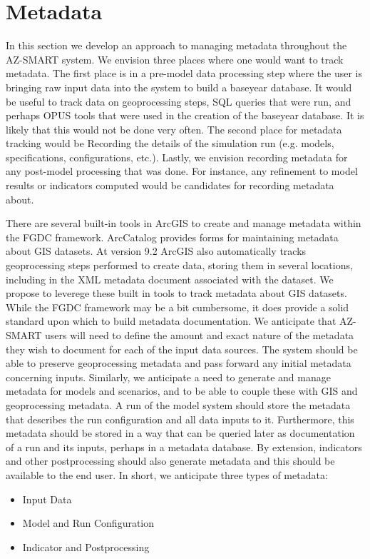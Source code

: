 \section{Metadata}

In this section we develop an approach to managing metadata throughout the AZ-SMART system.  
We envision three places where one would want to track metadata.  The first place is in a pre-model 
data processing step where the user is bringing raw input data into the system to build a baseyear 
database.  It would be useful to track data on geoprocessing steps, SQL queries that were run, and
perhaps OPUS tools that were used in the creation of the baseyear database.  It is likely that this
would not be done very often.  The second place for metadata tracking would be Recording the details
of the simulation run (e.g. models, specifications, configurations, etc.).  Lastly, we envision
recording metadata for any post-model processing that was done.  For instance, any refinement to
model results or indicators computed would be candidates for recording metadata about.

There are several built-in tools in ArcGIS to create and manage metadata within the FGDC framework.  ArcCatalog 
provides forms for maintaining metadata about GIS datasets.  At version 9.2 ArcGIS also automatically
tracks geoprocessing steps performed to create data, storing them in several locations, including 
in the XML metadata document associated with the dataset.
We propose to leverege these built in tools to track metadata about GIS datasets.  While the FGDC framework
may be a bit cumbersome, it does provide a solid standard upon which to build metadata documentation.
We anticipate that AZ-SMART
users will need to define the amount and exact nature of the metadata they wish to document for each of
the input data sources.  The system should be able to preserve geoprocessing metadata and pass forward
any initial metadata concerning inputs.  Similarly, we anticipate a need to generate and manage
metadata for models and scenarios, and to be able to couple these with GIS and geoprocessing
metadata.  A run of the model system should store the metadata that describes the run configuration
and all data inputs to it.  Furthermore, this metadata should be stored in a way that can be queried
later as documentation of a run and its inputs, perhaps in a metadata database.  By extension, indicators
and other postprocessing should also generate metadata and this should be available to the end user.  
In short, we anticipate three types of metadata:

\begin{itemize}
\item Input Data
\item Model and Run Configuration
\item Indicator and Postprocessing
\end{itemize}
